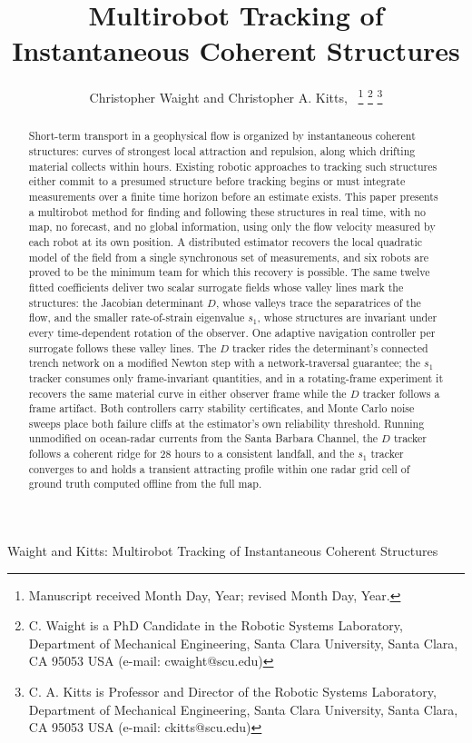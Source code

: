 \documentclass[lettersize,journal]{IEEEtran}
\begin{document}
\title{Multirobot Tracking of
Instantaneous Coherent Structures}

\author{Christopher Waight and Christopher A. Kitts,~
\thanks{Manuscript received Month Day, Year; revised Month Day, Year.}
\thanks{C. Waight is a PhD Candidate in the Robotic Systems Laboratory, Department of Mechanical
Engineering, Santa Clara University, Santa Clara, CA 95053 USA (e-mail: cwaight@scu.edu)}
\thanks{C. A. Kitts is Professor and Director of the Robotic Systems Laboratory, Department of
Mechanical Engineering, Santa Clara University, Santa Clara, CA 95053 USA (e-mail: ckitts@scu.edu)}
}
%
{Waight and Kitts: Multirobot Tracking of Instantaneous Coherent Structures}

\maketitle

\begin{abstract}
Short-term transport in a geophysical flow is organized by instantaneous
coherent structures: curves of strongest local attraction and repulsion,
along which drifting material collects within hours. Existing robotic
approaches to tracking such structures either commit to a presumed
structure before tracking begins or must integrate measurements over a
finite time horizon before an estimate exists. This paper presents a
multirobot method for finding and following these structures in real
time, with no map, no forecast, and no global information, using only
the flow velocity measured by each robot at its own position. A
distributed estimator recovers the local quadratic model of the field
from a single synchronous set of measurements, and six robots are
proved to be the minimum team for which this recovery is possible. The
same twelve fitted coefficients deliver two scalar surrogate fields
whose valley lines mark the structures: the Jacobian determinant $D$,
whose valleys trace the separatrices of the flow, and the smaller
rate-of-strain eigenvalue $s_1$, whose structures are invariant under
every time-dependent rotation of the observer. One adaptive navigation
controller per surrogate follows these valley lines. The $D$ tracker
rides the determinant's connected trench network on a modified Newton
step with a network-traversal guarantee; the $s_1$ tracker consumes
only frame-invariant quantities, and in a rotating-frame experiment it
recovers the same material curve in either observer frame while the $D$
tracker follows a frame artifact. Both controllers carry stability
certificates, and Monte Carlo noise sweeps place both failure cliffs at
the estimator's own reliability threshold. Running unmodified on
ocean-radar currents from the Santa Barbara Channel, the $D$ tracker
follows a coherent ridge for 28 hours to a consistent landfall, and the
$s_1$ tracker converges to and holds a transient attracting profile
within one radar grid cell of ground truth computed offline from the
full map.
\end{abstract}
\end{document}
